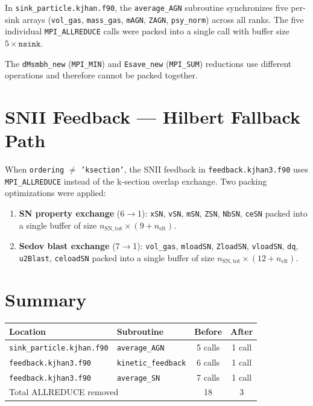 \documentclass[11pt,fleqn]{book}
\begin{document}
In \texttt{sink\_particle.kjhan.f90}, the \texttt{average\_AGN} subroutine synchronizes five per-sink arrays (\texttt{vol\_gas}, \texttt{mass\_gas}, \texttt{mAGN}, \texttt{ZAGN}, \texttt{psy\_norm}) across all ranks. The five individual \texttt{MPI\_ALLREDUCE} calls were packed into a single call with buffer size $5 \times \texttt{nsink}$.

\begin{remark}
The \texttt{dMsmbh\_new} (\texttt{MPI\_MIN}) and \texttt{Esave\_new} (\texttt{MPI\_SUM}) reductions use different operations and therefore cannot be packed together.
\end{remark}

\section{SNII Feedback --- Hilbert Fallback Path}

When \texttt{ordering} $\ne$ \texttt{'ksection'}, the SNII feedback in \texttt{feedback.kjhan3.f90} uses \texttt{MPI\_ALLREDUCE} instead of the k-section overlap exchange. Two packing optimizations were applied:

\begin{enumerate}[leftmargin=2em]
  \item \textbf{SN property exchange} (6$\to$1): \texttt{xSN}, \texttt{vSN}, \texttt{mSN}, \texttt{ZSN}, \texttt{NbSN}, \texttt{ceSN} packed into a single buffer of size $n_\mathrm{SN,tot} \times (9 + n_\mathrm{elt})$.
  \item \textbf{Sedov blast exchange} (7$\to$1): \texttt{vol\_gas}, \texttt{mloadSN}, \texttt{ZloadSN}, \texttt{vloadSN}, \texttt{dq}, \texttt{u2Blast}, \texttt{celoadSN} packed into a single buffer of size $n_\mathrm{SN,tot} \times (12 + n_\mathrm{elt})$.
\end{enumerate}

\section{Summary}

\begin{center}
\begin{tabular}{llcc}
\toprule
\textbf{Location} & \textbf{Subroutine} & \textbf{Before} & \textbf{After} \\
\midrule
\texttt{sink\_particle.kjhan.f90} & \texttt{average\_AGN} & 5 calls & 1 call \\
\texttt{feedback.kjhan3.f90} & \texttt{kinetic\_feedback} & 6 calls & 1 call \\
\texttt{feedback.kjhan3.f90} & \texttt{average\_SN} & 7 calls & 1 call \\
\midrule
\multicolumn{2}{l}{Total ALLREDUCE removed} & 18 & 3 \\
\bottomrule
\end{tabular}
\end{center}
\end{document}
